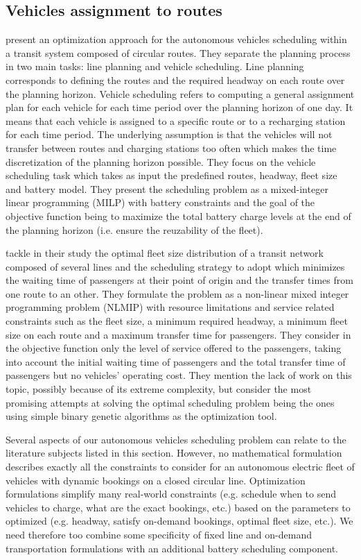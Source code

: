 \documentclass[12pt,a4paper]{article}
\begin{document}
\subsection{Vehicles assignment to routes}\label{luts}
\cite{luts} present an optimization approach for the autonomous vehicles scheduling within a transit system composed of circular routes. They separate the planning process in two main tasks: line planning and vehicle scheduling. Line planning corresponds to defining the routes and the required headway on each route over the planning horizon. Vehicle scheduling refers to computing a general assignment plan for each vehicle for each time period over the planning horizon of one day. It means that each vehicle is assigned to a specific route or to a recharging station for each time period. The underlying assumption is that the vehicles will not transfer between routes and charging stations too often which makes the time discretization of the planning horizon possible. They focus on the vehicle scheduling task which takes as input the predefined routes, headway, fleet size and battery model. They present the scheduling problem as a mixed-integer linear programming (MILP) with battery constraints and the goal of the objective function being to maximize the total battery charge levels at the end of the planning horizon (i.e. ensure the reuzability of the fleet). 

\cite{ga} tackle in their study the optimal fleet size distribution of a transit network composed of several lines and the scheduling strategy to adopt which minimizes the waiting time of passengers at their point of origin and the transfer times from one route to an other. They formulate the problem as a non-linear mixed integer programming problem (NLMIP) with resource limitations and service related constraints such as the fleet size, a minimum required headway, a minimum fleet size on each route and a maximum transfer time for passengers. They consider in the objective function only the level of service offered to the passengers, taking into account the initial waiting time of passengers and the total transfer time of passengers but no vehicles' operating cost. They mention the lack of work on this topic, possibly because of its extreme complexity, but consider the most promising attempts at solving the optimal scheduling problem being the ones using simple binary genetic algorithms as the optimization tool. 

Several aspects of our autonomous vehicles scheduling problem can relate to the literature subjects listed in this section. However, no mathematical formulation describes exactly all the constraints to consider for an autonomous electric fleet of vehicles with dynamic bookings on a closed circular line. Optimization formulations simplify many real-world constraints (e.g. schedule when to send vehicles to charge, what are the exact bookings, etc.) based on the parameters to optimized (e.g. headway, satisfy on-demand bookings, optimal fleet size, etc.). We need therefore too combine some specificity of fixed line and on-demand transportation formulations with an additional battery scheduling component.  
\end{document}

